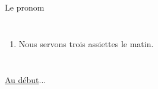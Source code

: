 \documentclass{beamer}
\begin{document}
\begin{frame}{Le pronom }
\begin{columns}[t]
\begin{enumerate}
            \item Nous \underline{  } servons \underline{\hspace{0.35cm}} trois \underline{\hspace{0.35cm}} assiettes \underline{\hspace{0.35cm}} le matin.
          \end{enumerate}
      \end{columns}
      \vspace{0.5cm}
      \hyperlink{début}{Au début}...
    \end{frame}
\end{document}
